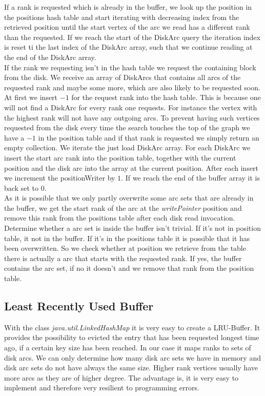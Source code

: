 If a rank is requested which is already in the buffer, we look up the position in the positions hash table and start iterating with decreasing index from the retrieved position until the start vertex of the arc we read has a different rank than the requested.
If we reach the start of the DiskArc query the iteration index is reset ti the last index of the DiskArc array, such that we continue reading at the end of the DiskArc array.
\\
If the rank we requesting isn't in the hash table we request the containing block from the disk.
We receive an array of DiskArcs that contains all arcs of the requested rank and maybe some more, which are also likely to be requested soon.
At first we insert $-1$ for the request rank into the hash table.
This is because one will not find a DiskArc for every rank one requests.
For instance the vertex with the highest rank will not have any outgoing arcs.
To prevent having such vertices requested from the disk every time the search touches the top of the graph we have a $-1$ in the position table and if that rank is requested we simply return an empty collection.
We iterate the just load DiskArc array.
For each DiskArc we insert the start arc rank into the position table, together with the current position and the disk arc into the array at the current position.
After each insert we increment the positionWriter by $1$.
If we reach the end of the buffer array it is back set to $0$.
\\
As it is possible that we only partly overwrite some arc sets that are already in the buffer, we get the start rank of the arc at the \textit{writePointer} position and remove this rank from the positions table after each disk read invocation.
\\ 
Determine whether a arc set is inside the buffer isn't trivial.
If it's not in position table, it not in the buffer.
If it's in the positions table it is possible that it has been overwritten.
So we check whether at position we retrieve from the table there is actually a arc that starts with the requested rank.
If yes, the buffer contains the arc set, if no it doesn't and we remove that rank from the position table.

\subsection{Least Recently Used Buffer}

With the class \textit{java.util.LinkedHashMap} it is very easy to create a LRU-Buffer.
It provides the possibility to evicted the entry that has been requested longest time ago, if a certain key size has been reached.
In our case it maps ranks to sets of disk arcs.
We can only determine how many disk arc sets we have in memory and disk arc sets do not have always the same size.
Higher rank vertices usually have more arcs as they are of higher degree.
The advantage is, it is very easy to implement and therefore very resilient to programming errors.


